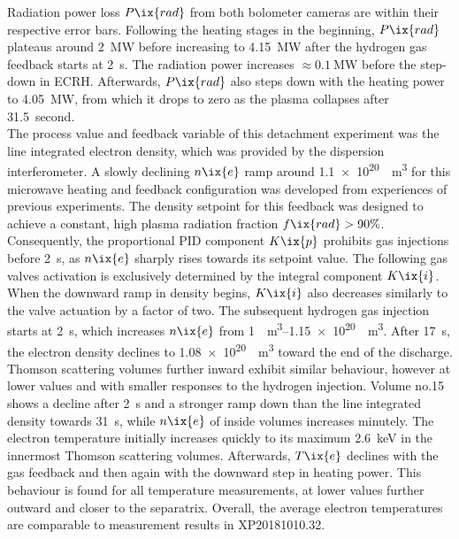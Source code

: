 %
                Radiation power loss $P\ix{rad}$ from both bolometer cameras are within their respective error bars. Following the heating stages in the beginning, $P\ix{rad}$ plateaus around \SI{2}{\mega\watt} before increasing to \SI{4.15}{\mega\watt} after the hydrogen gas feedback starts at \SI{2}{\second}. The radiation power increases $\approx\SI{0.1}{\mega\watt}$ before the step-down in ECRH. Afterwards, $P\ix{rad}$ also steps down with the heating power to \SI{4.05}{\mega\watt}, from which it drops to zero as the plasma collapses after \SI{31.5}{second}.\\%
                The process value and feedback variable of this detachment experiment was the line integrated electron density, which was provided by the dispersion interferometer. A slowly declining $n\ix{e}$ ramp around \SI[per-mode=reciprocal]{1.1e20}{\per\cubic\meter} for this microwave heating and feedback configuration was developed from experiences of previous experiments. The density setpoint for this feedback was designed to achieve a constant, high plasma radiation fraction $f\ix{rad}>90\%$\cite{Krychowiak2021}. Consequently, the proportional PID component $K\ix{p}$ prohibits gas injections before \SI{2}{\second}, as $n\ix{e}$ sharply rises towards its setpoint value. The following gas valves activation is exclusively determined by the integral component $K\ix{i}$. When the downward ramp in density begins, $K\ix{i}$ also decreases similarly to the valve actuation by a factor of two. The subsequent hydrogen gas injection starts at \SI{2}{\second}, which increases $n\ix{e}$ from \SIrange[per-mode=reciprocal]{1}{1.15e20}{\per\cubic\meter}. After \SI{17}{\second}, the electron density declines to \SI[per-mode=reciprocal]{1.08e20}{\per\cubic\meter} toward the end of the discharge. Thomson scattering volumes further inward exhibit similar behaviour, however at lower values and with smaller responses to the hydrogen injection. Volume no.15 shows a decline after \SI{2}{\second} and a stronger ramp down than the line integrated density towards \SI{31}{\second}, while $n\ix{e}$ of inside volumes increases minutely. The electron temperature initially increases quickly to its maximum \SI{2.6}{\kilo\electronvolt} in the innermost Thomson scattering volumes. Afterwards, $T\ix{e}$ declines with the gas feedback and then again with the downward step in heating power. This behaviour is found for all temperature measurements, at lower values further outward and closer to the separatrix. Overall, the average electron temperatures are comparable to measurement results in XP20181010.32.\\%
